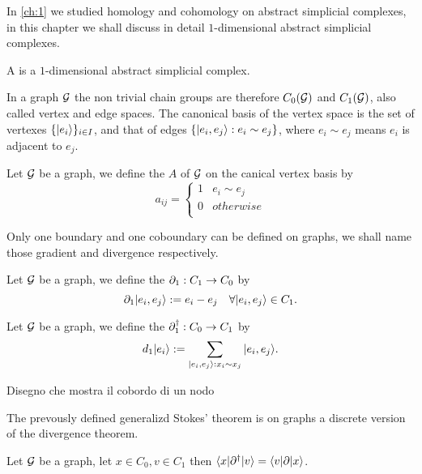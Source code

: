 \documentclass[../2.tex]{subfiles}
\begin{document}
    In \autoref{ch:1} we studied homology and cohomology on abstract simplicial complexes, in this chapter we shall discuss in detail
    $1$-dimensional abstract simplicial complexes.

    \begin{defn}
        A  is a $1$-dimensional abstract simplicial complex.
    \end{defn}

    In a graph $\mathcal{G}$ the non trivial chain groups are therefore $C_0(\mathcal{G})$ and $C_1(\mathcal{G})$, also called vertex and edge spaces. 
    The canonical basis of the vertex space is the set of vertexes $\{| e_i \rangle\}_{i \in I}$, and that of edges $\{| e_i,e_j \rangle : e_i \sim e_j\}$, where $e_i \sim e_j$ means $e_i$ is adjacent to $e_j$.

    \begin{defn}
        Let $\mathcal{G}$ be a graph, we define the  $A$ of $\mathcal{G}$ on the canical vertex basis by
        \[a_{ij} = 
        \begin{cases}
            1 & e_i \sim e_j \\
            0 & otherwise \\
        \end{cases} \]        
    \end{defn}
    Only one boundary and one coboundary can be defined on graphs, we shall name those gradient and divergence respectively.

    \begin{defn}
        Let $\mathcal{G}$ be a graph, we define the  $\partial_1 : C_1 \to C_0$ by 
        \[ \partial_1| e_i,e_j \rangle := e_i - e_j \quad \forall | e_i,e_j \rangle \in C_1.\]
    \end{defn}
    
    \begin{defn}
        Let $\mathcal{G}$ be a graph, we define the  $\partial^\dagger_1 : C_0 \to C_1$ by 
        \[ d_1| e_i \rangle := \sum_{| e_i,e_j \rangle : x_i \sim x_j} | e_i,e_j \rangle.\]
    \end{defn}

    {\color{red} Disegno che mostra il cobordo di un nodo}

    The prevously defined generalizd Stokes' theorem is on graphs a discrete version of the divergence theorem.

    \begin{thm}
        Let $\mathcal{G}$ be a graph, let $x \in C_0, v \in C_1$ then $\langle x |\partial^\dagger| v \rangle = \langle v |\partial| x \rangle$.
    \end{thm}
\end{document}
